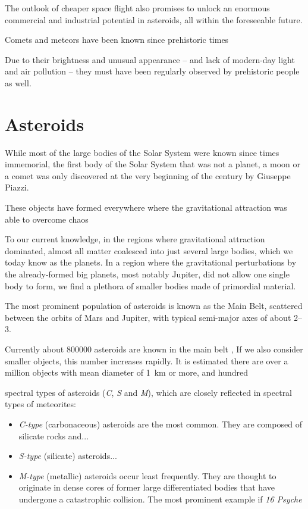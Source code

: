 The outlook of cheaper space flight also promises to unlock an enormous commercial and industrial potential in asteroids,
all within the foreseeable future.

Comets and meteors have been known since prehistoric times

Due to their brightness and unusual appearance -- and lack of modern-day light and air pollution -- they
must have been regularly observed by prehistoric people as well.



\section{Asteroids} \label{aa}
    While most of the large bodies of the Solar System were known since times immemorial,
    the first body of the Solar System that was not a planet, a moon or a comet was only discovered at
    the very beginning of the  century by Giuseppe Piazzi.

    These objects have formed everywhere where the gravitational attraction was able to overcome chaos \citep{???}

    To our current knowledge, in the regions where gravitational attraction dominated, almost all matter
    coalesced into just several large bodies, which we today know as the planets.
    In a region where the gravitational perturbations by the already-formed big planets, most notably Jupiter,
    did not allow one single body to form, we find a plethora of smaller bodies made of primordial material.

    The most prominent population of asteroids is known as the Main Belt, scattered between the orbits
    of Mars and Jupiter, with typical semi-major axes of about \SIrange{2}{3}{\au}.

    Currently about \num{800000} asteroids are known in the main belt ,
    If we also consider smaller objects, this number increases rapidly.
    It is estimated \citep{???} there are over a million objects with mean diameter of \SI{1}{\kilo\metre} or more,
    and hundred

    spectral types of asteroids (\emph{C}, \emph{S} and \emph{M}), which are closely reflected in
    spectral types of meteorites:

    \begin{itemize}
        \item \emph{C-type} (carbonaceous) asteroids are the most common. They are composed of silicate rocks and... 
        \item \emph{S-type} (silicate) asteroids... 
        \item \emph{M-type} (metallic) asteroids occur least frequently.
            They are thought to originate in dense cores of former large differentiated bodies that have
            undergone a catastrophic collision.
            The most prominent example if \emph{16 Psyche}
    \end{itemize}



